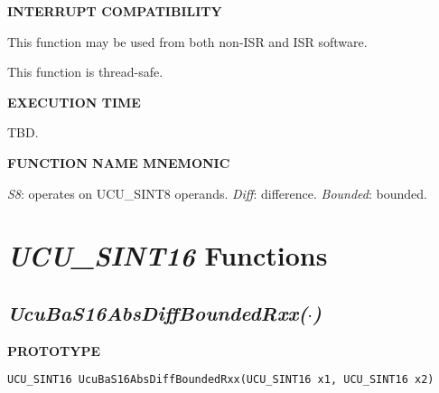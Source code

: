 \noindent\textbf{INTERRUPT COMPATIBILITY}
\begin{list}{}{\setlength{\leftmargin}{0.25in}\setlength{\topsep}{0.0in}}
\item This function may be used from both non-ISR and ISR software.
\item This function is thread-safe.
\end{list}
\vspace{2.8ex}

\noindent\textbf{EXECUTION TIME}
\begin{list}{}{\setlength{\leftmargin}{0.25in}\setlength{\topsep}{0.0in}}
\item TBD.
\end{list}
\vspace{2.8ex}

\noindent\textbf{FUNCTION NAME MNEMONIC}
\begin{list}{}{\setlength{\leftmargin}{0.25in}\setlength{\topsep}{0.0in}}
\item \emph{S8}:        operates on UCU\_SINT8 operands.
      \emph{Diff}:      difference.
      \emph{Bounded}:   bounded.
\end{list}


\section{\emph{UCU\_SINT16} Functions}
\label{cbaf0:sscf1}


\subsection[\emph{UcuBaS16AbsDiffBoundedRxx(\protect\mbox{\protect$\cdot$})}]
           {\emph{UcuBaS16AbsDiffBoundedRxx(\protect\mbox{\protect\boldmath $\cdot$})}}
\label{cbaf0:sscf1:sfss1}

%

\noindent\textbf{PROTOTYPE}
\begin {list}{}{\setlength{\leftmargin}{0.25in}\setlength{\topsep}{0.0in}}
\item
\begin{verbatim}
UCU_SINT16 UcuBaS16AbsDiffBoundedRxx(UCU_SINT16 x1, UCU_SINT16 x2)
\end{verbatim}
\end{list}
\vspace{2.8ex}

